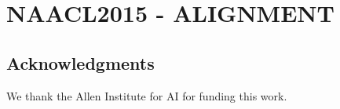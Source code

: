 %

\chapter{NAACL2015 - ALIGNMENT\label{chapter:naacl2015}}


%
%



%
%

\section*{Acknowledgments}
We thank the Allen Institute for AI for funding this work.

%

%
%
%
%

